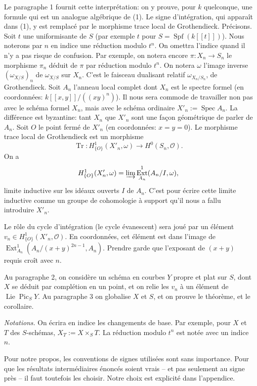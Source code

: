 \documentclass[11pt,leqno]{article}
\DeclareMathOperator{\Spec}{Spec}
\DeclareMathOperator{\Spf}{Spf}
\DeclareMathOperator{\Lie}{Lie}
\DeclareMathOperator{\Pic}{Pic}
\DeclareMathOperator{\Ext}{Ext}
\DeclareMathOperator{\Tr}{Tr}
\newcommand{\OO}{\mathcal O}
\begin{document}
Le paragraphe 1 fournit cette interprétation: on y prouve, pour $k$ quelconque, une formule qui est un analogue algébrique de (1). Le signe d'intégration, qui apparaît dans (1), y est remplacé par le morphisme trace local de Grothendieck. Précisons. Soit $t$ une uniformisante de $S$ (par exemple $t$ pour $S=\Spf(k[[t]])$). Nous noterons par $n$ en indice une réduction modulo $t^n$. On omettra l'indice quand il n'y a pas risque de confusion. Par exemple, on notera encore $\pi:X_n\to S_n$ le morphisme $\pi_n$ déduit de $\pi$ par réduction modulo $t^n$. On notera $\omega$ l'image inverse $(\omega_{X/S})_n$ de $\omega_{X/S}$ sur $X_n$. C'est le faisceau dualisant relatif $\omega_{X_n/S_n}$, de Grothendieck. Soit $A_n$ l'anneau local complet dont $X_n$ est le spectre formel (en coordonnées: $k[[x,y]]/((xy)^n)$). Il nous sera commode de travailler non pas avec le schéma formel $X_n$, mais avec le schéma ordinaire $X'_n:=\Spec A_n$. La différence est byzantine: tant $X_n$ que $X'_n$ sont une façon géométrique de parler de $A_n$. Soit $O$ le point fermé de $X'_n$ (en coordonnées: $x=y=0$). Le morphisme trace local de Grothendieck est un morphisme
\[
        \Tr:H^1_{\{O\}}(X'_n,\omega)\longrightarrow H^0(S_n,\OO).
\]
On a
\[
        H^1_{\{O\}}(X'_n,\omega)=\varinjlim \Ext^1_{A_n}(A_n/I,\omega),
\]
limite inductive sur les idéaux ouverts $I$ de $A_n$. C'est pour écrire cette limite inductive comme un groupe de cohomologie à support qu'il nous a fallu introduire $X'_n$.

Le rôle du cycle d'intégration (le cycle évanescent) sera joué par un élément $v_n\in H^1_{\{O\}}(X'_n,\OO)$. En coordonnées, cet élément est dans l'image de $\Ext^1_{A_n}(A_n/(x+y)^{2n-1},A_n)$. Prendre garde que l'exposant de $(x+y)$ requis croît avec $n$.

Au paragraphe 2, on considère un schéma en courbes $Y$ propre et plat sur $S$, dont $X$ se déduit par complétion en un point, et on relie les $v_n$ à un élément de $\Lie\Pic_S Y$. Au paragraphe 3 on globalise $X$ et $S$, et on prouve le théorème, et le corollaire.

\medskip
\noindent\emph{Notations.} On écrira en indice les changements de base. Par exemple, pour $X$ et $T$ des $S$-schémas, $X_T:=X\times_ST$. La réduction modulo $t^n$ est notée avec un indice $n$.

Pour notre propos, les conventions de signes utilisées sont sans importance. Pour que les résultats intermédiaires énoncés soient vrais -- et pas seulement au signe près -- il faut toutefois les choisir. Notre choix est explicité dans l'appendice.
\end{document}
